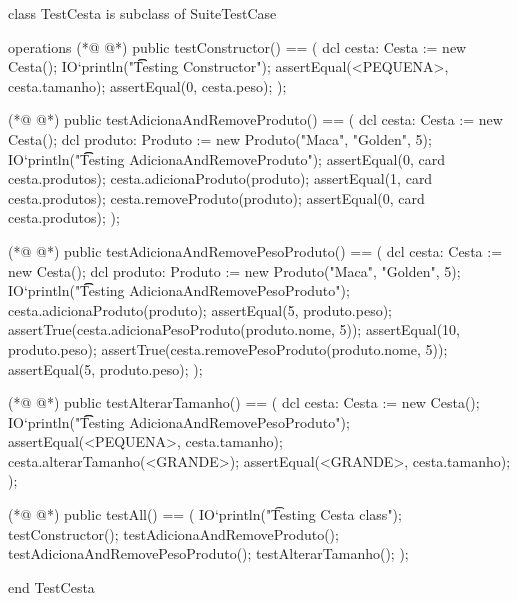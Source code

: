 \begin{vdmpp}[breaklines=true]
class TestCesta is subclass of SuiteTestCase

operations
(*@
\label{testConstructor:4}
@*)
  public testConstructor() == (
   dcl cesta: Cesta := new Cesta();
    IO`println("\t\t Testing Constructor");
    assertEqual(<PEQUENA>, cesta.tamanho);
    assertEqual(0, cesta.peso);
  );
  
(*@
\label{testAdicionaAndRemoveProduto:11}
@*)
  public testAdicionaAndRemoveProduto() == (
   dcl cesta: Cesta := new Cesta();
   dcl produto: Produto := new Produto("Maca", "Golden", 5);
   IO`println("\t\t Testing AdicionaAndRemoveProduto");
   assertEqual(0, card cesta.produtos); 
   cesta.adicionaProduto(produto);
   assertEqual(1, card cesta.produtos);  
   cesta.removeProduto(produto);
   assertEqual(0, card cesta.produtos);  
  );
  
(*@
\label{testAdicionaAndRemovePesoProduto:22}
@*)
  public testAdicionaAndRemovePesoProduto() == (
   dcl cesta: Cesta := new Cesta();
   dcl produto: Produto := new Produto("Maca", "Golden", 5);
  IO`println("\t\t Testing AdicionaAndRemovePesoProduto");
  cesta.adicionaProduto(produto);
  assertEqual(5, produto.peso);  
  assertTrue(cesta.adicionaPesoProduto(produto.nome, 5));
  assertEqual(10, produto.peso);  
  assertTrue(cesta.removePesoProduto(produto.nome, 5));
  assertEqual(5, produto.peso);  
  );
  
(*@
\label{testAlterarTamanho:34}
@*)
  public testAlterarTamanho() == (
   dcl cesta: Cesta := new Cesta();
  IO`println("\t\t Testing AdicionaAndRemovePesoProduto");
  assertEqual(<PEQUENA>, cesta.tamanho);
  cesta.alterarTamanho(<GRANDE>);
  assertEqual(<GRANDE>, cesta.tamanho);
  );

(*@
\label{testAll:42}
@*)
  public testAll() == (
    IO`println("\t Testing Cesta class");
    testConstructor();
    testAdicionaAndRemoveProduto();
    testAdicionaAndRemovePesoProduto();
    testAlterarTamanho();
  );

end TestCesta
\end{vdmpp}
